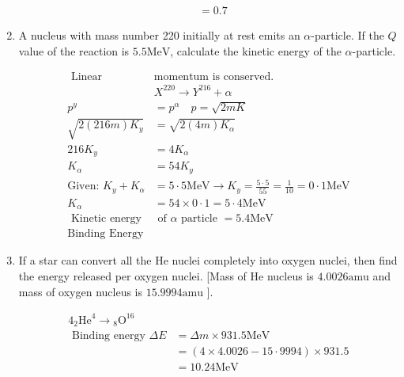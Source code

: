 \begin{enumerate}
\begin{answer}
\begin{align*}
		&=0.7
		\end{align*}
	\end{answer}
	\item  A nucleus with mass number 220 initially at rest emits an $\alpha$-particle. If the $Q$ value of the reaction is $5.5 \mathrm{MeV}$, calculate the kinetic energy of the $\alpha$-particle.
	\begin{answer}
		\begin{align*}
		\text{ Linear }&\text{momentum is conserved.}\\
		&X^{220} \rightarrow Y^{216}+\alpha \\
		p^y&=p^\alpha \quad p=\sqrt{2 m K} \\
		\sqrt{2(216 m) K_y}&=\sqrt{2(4 m) K_\alpha} \\
		216 K_y&=4 K_\alpha \\
		K_\alpha&=54 K_y\\
		\text{Given: }K_y+K_\alpha&=5 \cdot 5 \mathrm{MeV} \rightarrow K_y=\frac{5 \cdot 5}{55}=\frac{1}{10}=0 \cdot 1 \mathrm{MeV}\\
		K_\alpha&=54 \times 0 \cdot 1=5 \cdot 4 \mathrm{MeV}\\
	\text{	Kinetic energy}&\text{ of $\alpha$ particle }=5.4 \mathrm{MeV}\\
		\text{Binding Energy}&
		\end{align*}
	\end{answer}
	\item  If a star can convert all the He nuclei completely into oxygen nuclei, then find the energy released per oxygen nuclei. [Mass of He nucleus is $4.0026 \mathrm{amu}$ and mass of oxygen nucleus is $15.9994 \mathrm{amu}$ ].
	\begin{answer}
		\begin{align*}
		4_2 \mathrm{He}^4 \longrightarrow{ }_8 \mathrm{O}^{16}\\
	\text{	Binding energy }\Delta E&=\Delta m \times 931.5 \mathrm{MeV}\\
		&=(4 \times 4.0026-15 \cdot 9994) \times 931.5 \\
		&=10.24 \mathrm{MeV}
		\end{align*}
	\end{answer}
\end{enumerate}







